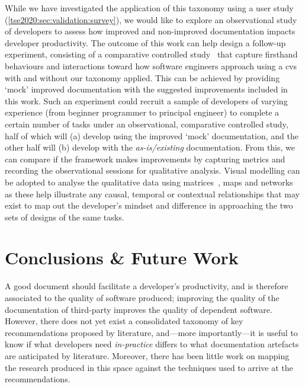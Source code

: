 While we have investigated the application of this taxonomy using a user study (\cref{tse2020:sec:validation:survey}), we would like to explore an observational study of developers to assess how improved and non-improved  documentation impacts developer productivity. The outcome of this work can help design a follow-up experiment, consisting of a comparative controlled study~\citep{Seaman:2007wa} that capture firsthand behaviours and interactions toward how software engineers approach using a \gls{cvs} with and without our taxonomy applied. This can be achieved by providing `mock' improved documentation with the suggested improvements included in this work. Such an experiment could recruit a sample of developers of varying experience (from beginner programmer to principal engineer) to complete a certain number of tasks under an observational, comparative controlled study, half of which will (a) develop using the improved `mock' documentation, and the other half will (b) develop with the \textit{as-is/existing} documentation. From this, we can compare if the framework makes improvements by capturing metrics and recording the observational sessions for qualitative analysis. Visual modelling can be adopted to analyse the qualitative data using matrices~\citep{Dey:2003ty}, maps and networks~\citep{Miles:1994ty} as these help illustrate any causal, temporal or contextual relationships that may exist to map out the developer's mindset and difference in approaching the two sets of designs of the same tasks.


\section{Conclusions \& Future Work}
\label{tse2020:sec:conclusions}

A good  document should facilitate a developer's productivity, and is therefore associated to the quality of software produced; improving the quality of the documentation of third-party  improves the quality of dependent software.
However, there does not yet exist a consolidated taxonomy of key recommendations proposed by literature, and---more importantly---it is useful to know if what developers need \textit{in-practice} differs to what documentation artefacts are anticipated by literature. Moreover, there has been little work on mapping the research produced in this space against the techniques used to arrive at the recommendations.

